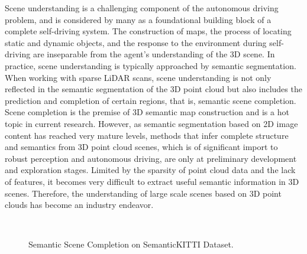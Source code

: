 \documentclass{article}
\begin{document}
Scene understanding is a challenging component of the autonomous driving problem, and is considered by many as a foundational building block of a complete self-driving system. The construction of maps, the process of locating static and dynamic objects, and the response to the environment during self-driving are inseparable from the agent's understanding of the 3D scene. In practice, scene understanding is typically approached by semantic segmentation. When working with sparse LiDAR scans, scene understanding is not only reflected in the semantic segmentation of the 3D point cloud but also includes the prediction and completion of certain regions, that is, semantic scene completion. Scene completion is the premise of 3D semantic map construction and is a hot topic in current research. However, as semantic segmentation based on 2D image content has reached very mature levels, methods that infer complete structure and semantics from 3D point cloud scenes, which is of significant import to robust perception and autonomous driving, are only at preliminary development and exploration stages. Limited by the sparsity of point cloud data and the lack of features, it becomes very difficult to extract useful semantic information in 3D scenes. Therefore, the understanding of large scale scenes based on 3D point clouds has become an industry endeavor.

\setlength{\columnsep}{5pt}\begin{wrapfigure}{r}{8cm}
  \centering
  \\
  \captionsetup{font=scriptsize,labelfont=scriptsize}
  \caption{Semantic Scene Completion on SemanticKITTI Dataset.}
  \label{fig:intro_prediction_gt_result}
  \vspace{-10px}
\end{wrapfigure}
\end{document}
